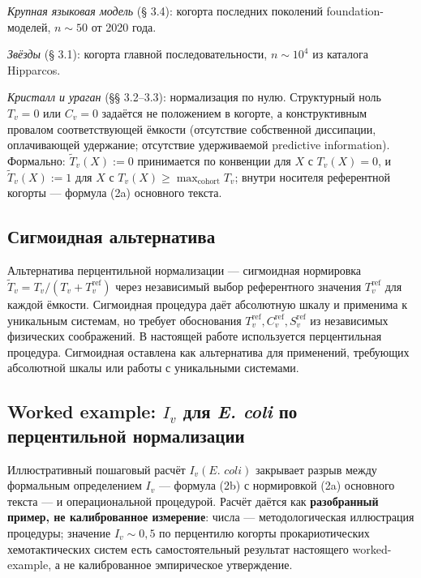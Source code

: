 \documentclass[pdflatex,sn-mathphys-ay]{sn-jnl}
\begin{document}
\emph{Крупная языковая модель} (§ 3.4): когорта последних поколений foundation-моделей, \(n \sim 50\) от 2020 года.

\emph{Звёзды} (§ 3.1): когорта главной последовательности, \(n \sim 10^4\) из каталога Hipparcos.

\emph{Кристалл и ураган} (§§ 3.2--3.3): нормализация по нулю. Структурный ноль \(T_v = 0\) или \(C_v = 0\) задаётся не положением в когорте, а конструктивным провалом соответствующей ёмкости (отсутствие собственной диссипации, оплачивающей удержание; отсутствие удерживаемой predictive information). Формально: \(\tilde{T}_v(X) := 0\) принимается по конвенции для \(X\) с \(T_v(X) = 0\), и \(\tilde{T}_v(X) := 1\) для \(X\) с \(T_v(X) \ge \max_{\text{cohort}} T_v\); внутри носителя референтной когорты --- формула (2a) основного текста.

\subsection*{Сигмоидная альтернатива}\label{ux441ux438ux433ux43cux43eux438ux434ux43dux430ux44f-ux430ux43bux44cux442ux435ux440ux43dux430ux442ux438ux432ux430}

Альтернатива перцентильной нормализации --- сигмоидная нормировка \(\tilde{T}_v = T_v / (T_v + T_v^{\text{ref}})\) через независимый выбор референтного значения \(T_v^{\text{ref}}\) для каждой ёмкости. Сигмоидная процедура даёт абсолютную шкалу и применима к уникальным системам, но требует обоснования \(T_v^{\text{ref}}, C_v^{\text{ref}}, S_v^{\text{ref}}\) из независимых физических соображений. В настоящей работе используется перцентильная процедура. Сигмоидная оставлена как альтернатива для применений, требующих абсолютной шкалы или работы с уникальными системами.

\subsection*{\texorpdfstring{Worked example: \(I_v\) для \emph{E. coli} по перцентильной нормализации}{Worked example: I\_v для E. coli по перцентильной нормализации}}\label{worked-example-i_v-ux434ux43bux44f-e.-coli-ux43fux43e-ux43fux435ux440ux446ux435ux43dux442ux438ux43bux44cux43dux43eux439-ux43dux43eux440ux43cux430ux43bux438ux437ux430ux446ux438ux438}

Иллюстративный пошаговый расчёт \(I_v(\textit{E. coli})\) закрывает разрыв между формальным определением \(I_v\) --- формула (2b) с нормировкой (2a) основного текста --- и операциональной процедурой. Расчёт даётся как \textbf{разобранный пример, не калиброванное измерение}: числа --- методологическая иллюстрация процедуры; значение \(I_v \sim 0{,}5\) по перцентилю когорты прокариотических хемотактических систем есть самостоятельный результат настоящего worked-example, а не калиброванное эмпирическое утверждение.
\end{document}
